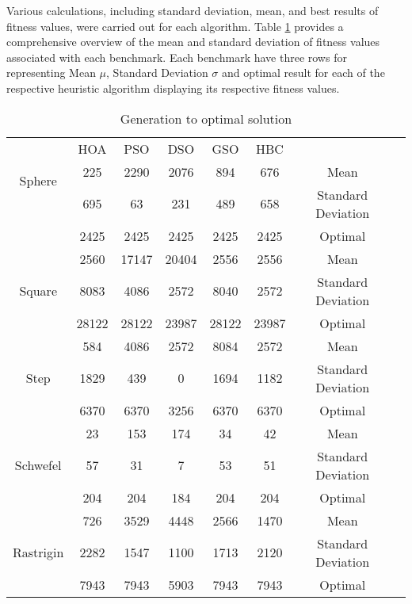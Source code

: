 \documentclass[conference]{IEEEtran}
\begin{document}
\begin{abstract1}
Various calculations, including standard deviation, mean, and best results of fitness values, were carried out for each algorithm. Table \ref{tabMathFunction} provides a comprehensive overview of the mean and standard deviation of fitness values associated with each benchmark. Each benchmark have three rows for representing Mean $\mu$, Standard Deviation $\sigma$ and optimal result for each of the respective heuristic algorithm displaying its respective fitness values. 



\begin{table}[htbp]
	\caption{Generation to optimal solution}
\label{tabMathFunction}
	\begin{center}
	\begin{tabular}{cccccccc|}
		\hline
	
		\multirow{3}{*}{Sphere} & HOA & PSO & DSO & GSO & HBC \\
	           					& 225 & 2290 & 2076 & 894 & 676 & Mean \\
	           					& 695 & 63 & 231 & 489 & 658 & Standard Deviation \\
	           					& 2425 & 2425  & 2425 & 2425 & 2425 & Optimal\\
	           					
	           					
	    \hline       					
	           
	     \multirow{3}{*}{Square} & 2560 & 17147 & 20404 & 2556 & 2556 & Mean \\
	     								& 8083 & 4086 & 2572 & 8040 & 2572 & Standard Deviation \\
	     								& 28122 & 28122 & 23987 & 28122 & 23987& Optimal	\\
	     								
	    \hline
	     \multirow{3}{*}{Step} & 584 & 4086 & 2572 & 8084 & 2572 & Mean \\
	     & 1829 & 439 & 0 & 1694 & 1182 & Standard Deviation \\
	     & 6370 & 6370 & 3256 & 6370 & 6370 & Optimal	\\	
	     
	     
	      \hline
	     \multirow{3}{*}{Schwefel} & 23 & 153 & 174 & 34 & 42 & Mean \\
	     & 57 & 31 & 7 & 53 & 51 &Standard Deviation \\
	     & 204 & 204 & 184 & 204 & 204& Optimal	\\	
	     
	     
	     \hline
	     \multirow{3}{*}{Rastrigin} & 726 & 3529 & 4448 & 2566 & 1470 & Mean \\
	     & 2282 & 1547 & 1100 & 1713 & 2120 & Standard Deviation \\
	     & 7943 & 7943 & 5903 & 7943 & 7943& Optimal	\\	
	     

\end{tabular}
\end{center}
\end{table}
\end{abstract1}
\end{document}
